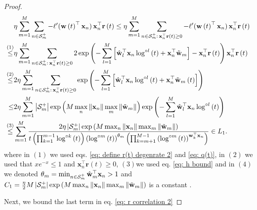 \documentclass[twoside,11pt,english]{article}
\begin{document}
{\begin{proof}
\begin{align}
 & \eta\sum_{m=1}^{M}\sum_{n\in\mathcal{S}_{m}^{+}}-\ell'(\mathbf{w}\left(t\right)^{\top}\mathbf{x}_{n})\,\mathbf{x}_{n}^{\top}\mathbf{r}\left(t\right)\le \eta\sum_{m=1}^{M}\sum_{n\in\mathcal{S}_{m}^{+}:\,\mathbf{x}_{n}^{\top}\mathbf{r}\left(t\right)\geq0}-\ell'(\mathbf{w}\left(t\right)^{\top}\mathbf{x}_{n})\,\mathbf{x}_{n}^{\top}\mathbf{r}\left(t\right)\nonumber \\
\overset{\left(1\right)}{\leq} & \eta\sum_{m=1}^{M}\sum_{n\in\mathcal{S}_{m}^{+}:\,\mathbf{x}_{n}^{\top}\mathbf{r}\left(t\right)\geq0}2\exp\left(-\sum_{l=1}^{M}\left[\hat{\mathbf{w}}_{l}^{\top}\mathbf{x}_{n}\log^{\circ l}\left(t\right)+\mathbf{x}_{n}^{\top}\tilde{\mathbf{w}}_m\right]-\mathbf{x}_{n}^{\top}\mathbf{r}\left(t\right)\right)\mathbf{x}_{n}^{\top}\mathbf{r}\left(t\right)\nonumber \\
\overset{\left(2\right)}{\leq} & 2\eta\sum_{m=1}^{M}\sum_{n\in\mathcal{S}_{m}^{+}:\,\mathbf{x}_{n}^{\top}\mathbf{r}\left(t\right)\geq0}\exp\left(-\sum_{l=1}^{M}\left[\hat{\mathbf{w}}_{l}^{\top}\mathbf{x}_{n}\log^{\circ l}\left(t\right)+\mathbf{x}_{n}^{\top}\tilde{\mathbf{w}}_{m}\left(t\right)\right]\right)\nonumber \\
{\leq} & 2\eta\sum_{m=1}^M\left|\mathcal{S}_{m}^{+}\right|\exp\left(M\max_{n}\left\Vert \mathbf{x}_{n}\right\Vert\max_m\|\tilde{\mathbf{w}}_m\|\right)\exp\left(-\sum_{l=1}^{M}\hat{\mathbf{w}}_{l}^{\top}\mathbf{x}_{n}\log^{\circ l}\left(t\right)\right)\nonumber \\
\overset{\left(3\right)}{\leq} & \sum_{m=1}^M\frac{2\eta\left|\mathcal{S}_{m}^{+}\right|\exp\left(M\max_{n}\left\Vert \mathbf{x}_{n}\right\Vert\max_m\|\tilde{\mathbf{w}}_m\|\right)}{t\left(\prod_{k=1}^{m-1}\log^{\circ k}\left(t\right)\right)\left(\log^{\circ m}\left(t\right)\right)^{\theta_{m}}\left(\prod_{k=m+1}^{M-1}\left(\log^{\circ m}\left(t\right)\right)^{\mathbf{w}_{k}^{\top}\mathbf{x}_{n}}\right)}\in L_1.\label{eq: bound on non-SV gradient-1}
\end{align}
where in $\left(1\right)$ we used eqs. \ref{eq: define r(t) degenrate 2}
and \ref{eq: q(t)}, in $\left(2\right)$ we used that $xe^{-x}\leq1$
and $\mathbf{x}_{n}^{\top}\mathbf{r}\left(t\right)\geq0$, $\left(3\right)$we
used eq. \ref{eq: h bound} and in $\left(4\right)$ we denoted $\theta_{m}=\min_{n\in\mathcal{S}_{m}^{+}}\hat{\mathbf{w}}_{m}^{\top}\mathbf{x}_{n}>1$ and $C_1=\frac{\eta}{2}M\left|\mathcal{S}_{m}^{+}\right|\exp\left(M\max_{n}\left\Vert \mathbf{x}_{n}\right\Vert \max_m\|\tilde{\mathbf{w}}_m\|\right)$ is a constant . 

Next, we bound the last term in eq. \ref{eq: r correlation 2}

\end{proof}}
\end{document}
